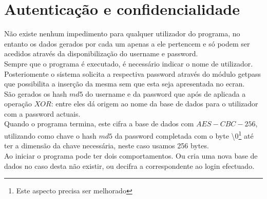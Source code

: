 \documentclass[10pt,journal,cspaper,compsoc]{IEEEtran}
\begin{document}
\section{Autenticação e confidencialidade}
Não existe nenhum impedimento para qualquer utilizador do programa, no entanto os dados gerados por cada um apenas a ele pertencem e só podem ser acedidos através da disponibilização do username e password.\\
Sempre que o programa é executado, é necessário indicar o nome de utilizador. Posteriomente o sistema solicita a respectiva password através do módulo getpass \cite{getpass} que possibilita a inserção da mesma sem que esta seja apresentada no ecran.\\
São gerados os hash $md5$ do username e da password que após de aplicada a operação $XOR$: entre eles dá origem ao nome da base de dados para o utilizador com a password actuais.\\
Quando o programa termina, este cifra a base de dados com $AES-CBC-256$, utilizando como chave o hash $md5$ da password completada com o byte \textbackslash$0$\footnote{Este aspecto precisa ser melhorado} até ter a dimensão da chave necessária, neste caso usamos 256 bytes.\\
Ao iniciar o programa pode ter dois comportamentos. Ou cria uma nova base de dados no caso desta não existir, ou decifra a correspondente ao login efectuado.
        
\end{document}
